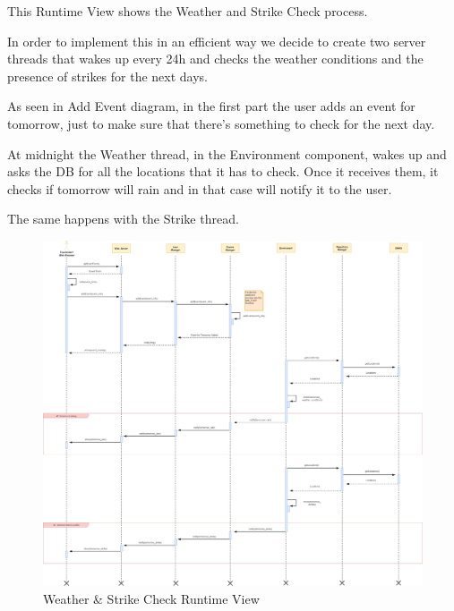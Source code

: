 This Runtime View shows the Weather and Strike Check process.\par
In order to implement this in an efficient way we decide to create two server threads that wakes up every 24h and checks the weather conditions and the presence of strikes for the next days.\par
As seen in Add Event diagram, in the first part the user adds an event for tomorrow, just to make sure that there’s something to check for the next day.\par
At midnight the Weather thread, in the Environment component, wakes up and asks the DB for all the locations that it has to check. Once it receives them, it checks if tomorrow will rain and in that case will notify it to the user.\par
The same happens with the Strike thread.
\begin{figure}[H]
	\centering
	\includegraphics[scale=0.165]{Images/Runtime/Weather_Strike_Check}
	\caption{Weather \& Strike Check Runtime View}
\end{figure}

